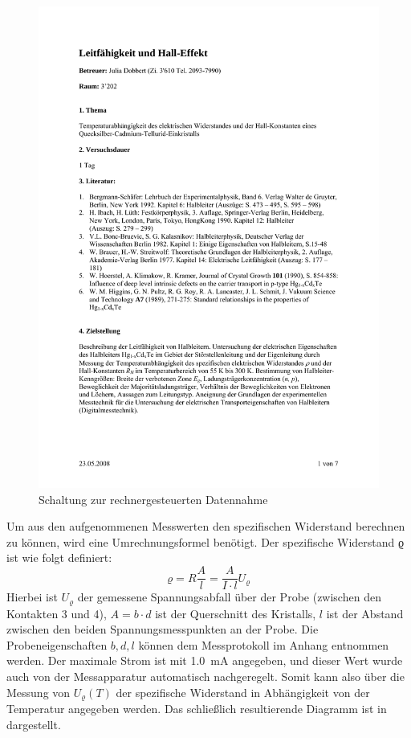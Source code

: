 \begin{figure}[htb]
 \centering
 \includegraphics[page=6,viewport=70 395 525 705,clip,width=\columnwidth,keepaspectratio]{../docs/Anleitung_Hall.pdf}
 \caption{Schaltung zur rechnergesteuerten Datennahme}
 \label{fig:Schaltung}
\end{figure}

Um aus den aufgenommenen Messwerten den spezifischen Widerstand berechnen zu
können, wird eine Umrechnungsformel benötigt. Der spezifische Widerstand ϱ ist
wie folgt definiert:
\begin{equation}
ϱ = R\frac{A}{l} = \frac{A}{I\cdot l} U_ϱ
\end{equation}
Hierbei ist $U_ϱ$ der gemessene Spannungsabfall über der Probe (zwischen den
Kontakten 3 und 4), $A= b\cdot d$ ist der Querschnitt des Kristalls, $l$ ist
der Abstand zwischen den beiden Spannungsmesspunkten an der Probe. Die
Probeneigenschaften $b, d, l$ können dem Messprotokoll im Anhang entnommen
werden. Der maximale Strom ist mit \SI{1,0}{\milli\ampere} angegeben, und
dieser Wert wurde auch von der Messapparatur automatisch nachgeregelt. Somit
kann also über die Messung von $U_ϱ(T)$ der spezifische Widerstand in
Abhängigkeit von der Temperatur angegeben werden. Das schließlich resultierende
Diagramm ist in  dargestellt.

